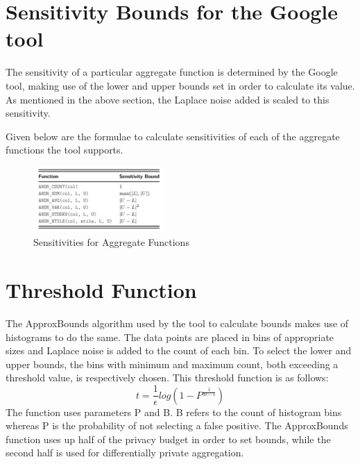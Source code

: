 \documentclass[acmsmall]{acmart}
\begin{document}
\section{Sensitivity Bounds for the Google tool}\label{Appendix. B}
The sensitivity of a particular aggregate function is determined by the Google tool, making use of the lower and upper bounds set in order to calculate its value. As mentioned in the above section, the Laplace noise added is scaled to this sensitivity.

Given below are the formulae to calculate sensitivities of each of the aggregate functions the tool supports. 

\begin{figure}[htp]
    \centering
    \includegraphics[width=5cm]{appendix1.png}
    \caption{Sensitivities for Aggregate Functions}
    \label{fig:aggregate_sensitivities}
\end{figure}

\section{Threshold Function}\label{Appendix. C}
The ApproxBounds algorithm used by the tool to calculate bounds makes use of histograms to do the same. The data points are placed in bins of appropriate sizes and Laplace noise is added to the count of each bin. To select the lower and upper bounds, the bins with minimum and maximum count, both exceeding a threshold value, is respectively chosen. This threshold function is as follows: 
\begin{equation}
    t = \frac{1}{\epsilon}log(1 - P^{\frac{1}{B-1}})
\end{equation}
The function uses parameters P and B. B refers to the count of histogram bins whereas P is the probability of not selecting a false positive. The ApproxBounds function uses up half of the privacy budget in order to set bounds, while the second half is used for differentially private aggregation.

\end{document}
